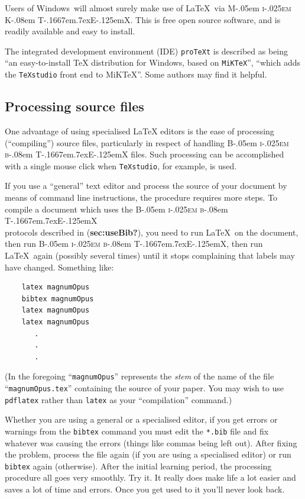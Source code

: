 \documentclass[
  times,
  doublespace]{anzsauth}
\newcommand\BibTeX{{\rmfamily B\kern-.05em \textsc{i\kern-.025em b}\kern-.08em
T\kern-.1667em\lower.7ex\hbox{E}\kern-.125emX}}
\newcommand\MiKTeX{{\rmfamily M\kern-.05em \textsc{i\kern-.025em K}\kern-.08em
T\kern-.1667em\lower.7ex\hbox{E}\kern-.125emX}}
\begin{document}
Users of Windows\texttrademark~will almost surely make use of \LaTeX~via
\MiKTeX. This is free open source software, and is readily available and
easy to install.

The integrated development environment (IDE) \texttt{proTeXt} is
described as being ``an easy-to-install \TeX{} distribution for
Windows\texttrademark, based on \texttt{MiKTeX}'', ``which adds the
\texttt{TeXstudio} front end to MiKTeX''. Some authors may find it
helpful.

\subsection{Processing source files}\label{sec:procBib}

One advantage of using specialised \LaTeX{} editors is the ease of
processing (``compiling'') source files, particularly in respect of
handling \BibTeX{} files. Such processing can be accomplished with a
single mouse click when \texttt{TeXstudio}, for example, is used.

If you use a ``general'' text editor and process the source of your
document by means of command line instructions, the procedure requires
more steps. To compile a document which uses the \BibTeX\\
protocols described in (\textbf{sec:useBib?}), you need to run \LaTeX~on
the document, then run \BibTeX, then run \LaTeX~again (possibly several
times) until it stops complaining that labels may have changed.
Something like:

\begin{verbatim}
    latex magnumOpus
    bibtex magnumOpus
    latex magnumOpus
    latex magnumOpus
       .
       .
       .
\end{verbatim}

(In the foregoing ``\texttt{magnumOpus}'' represents the \emph{stem} of
the name of the file ``\texttt{magnumOpus.tex}'' containing the source
of your paper. You may wish to use \texttt{pdflatex} rather than
\texttt{latex} as your ``compilation'' command.)

Whether you are using a general or a specialised editor, if you get
errors or warnings from the \texttt{bibtex} command you must edit the
\texttt{*.bib} file and fix whatever was causing the errors (things like
commas being left out). After fixing the problem, process the file again
(if you are using a specialised editor) or run \texttt{bibtex} again
(otherwise). After the initial learning period, the processing procedure
all goes very smoothly. Try it. It really does make life a lot easier
and saves a lot of time and errors. Once you get used to it you'll never
look back.
\end{document}
